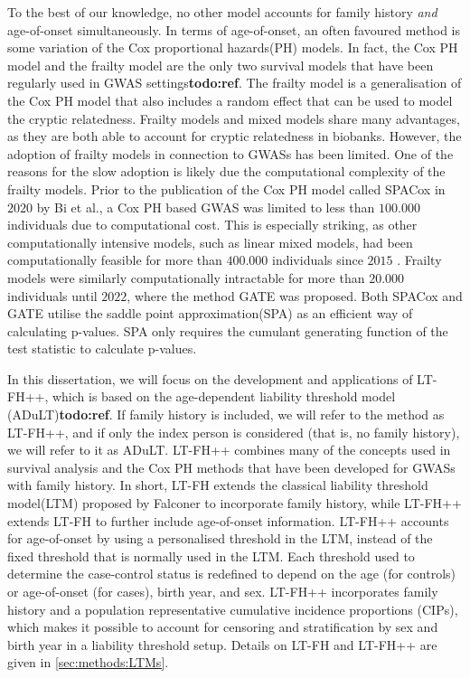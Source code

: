 To the best of our knowledge, no other model accounts for family history \textit{and} age-of-onset simultaneously. In terms of age-of-onset, an often favoured method is some variation of the Cox proportional hazards(PH) models. In fact, the Cox PH model and the frailty model are the only two survival models that have been regularly used in GWAS settings\textbf{todo:ref}. The frailty model is a generalisation of the Cox PH model that also includes a random effect that can be used to model the cryptic relatedness. Frailty models and mixed models share many advantages, as they are both able to account for cryptic relatedness in biobanks. However, the adoption of frailty models in connection to GWASs has been limited. One of the reasons for the slow adoption is likely due the computational complexity of the frailty models. Prior to the publication of the Cox PH model called SPACox in $ 2020 $ by Bi et al., a Cox PH based GWAS was limited to less than $ 100.000 $ individuals due to computational cost\cite{bi2020fast}. This is especially striking, as other computationally intensive models, such as linear mixed models, had been computationally feasible for more than $ 400.000 $ individuals since $ 2015 $ \cite{loh2015efficient}. Frailty models were similarly computationally intractable for more than $ 20.000 $ individuals until $ 2022 $, where the method GATE was proposed\cite{dey2022efficient}. Both SPACox and GATE utilise the saddle point approximation(SPA) as an efficient way of calculating p-values. SPA only requires the cumulant generating function of the test statistic to calculate p-values.

In this dissertation, we will focus on the development and applications of LT-FH++, which is based on the age-dependent liability threshold model (ADuLT)\textbf{todo:ref}. If family history is included, we will refer to the method as LT-FH++, and if only the index person is considered (that is, no family history), we will refer to it as ADuLT. LT-FH++ combines many of the concepts used in survival analysis and the Cox PH methods that have been developed for GWASs with family history. In short, LT-FH extends the classical liability threshold model(LTM) proposed by Falconer\cite{falconer1965inheritance,falconer1967inheritance} to incorporate family history, while LT-FH++ extends LT-FH to further include age-of-onset information. LT-FH++ accounts for age-of-onset by using a personalised threshold in the LTM, instead of the fixed threshold that is normally used in the LTM. Each threshold used to determine the case-control status is redefined to depend on the age (for controls) or age-of-onset (for cases), birth year, and sex. LT-FH++ incorporates family history and a population representative cumulative incidence proportions (CIPs), which makes it possible to account for censoring and stratification by sex and birth year in a liability threshold setup. Details on LT-FH and LT-FH++ are given in \cref{sec:methods:LTMs}.

